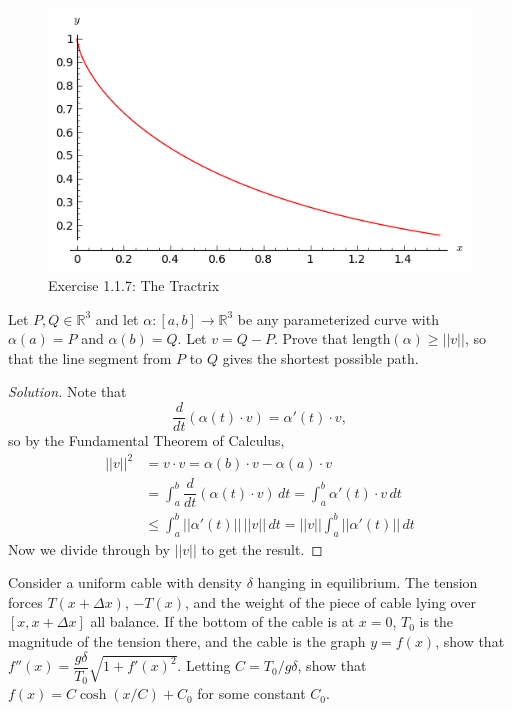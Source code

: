 \documentclass[Shifrin_Solutions_Spring_2018]{subfiles}
\begin{document}
\begin{figure}[h]
\centering
\includegraphics[width=.5\textwidth]{picturebook/ch1sec1/ex1-1-7}
\caption{Exercise 1.1.7: The Tractrix}
\end{figure}





\begin{exercise}
Let $P, Q \in \mathbb{R}^3$ and let $\alpha: [a,b] \rightarrow \mathbb{R}^3$ be any parameterized curve with $\alpha(a) = P$ and $\alpha(b) = Q$. Let $v= Q-P$. Prove that $\text{length}(\alpha) \geq ||v||$, so that the line segment from $P$ to $Q$ gives the shortest possible path.
\end{exercise}

\begin{proof}[Solution]
Note that
\[
\dfrac{d}{dt}\left( \alpha(t)\cdot v \right) = \alpha'(t)\cdot v ,
\]
so by the Fundamental Theorem of Calculus,
\[
\begin{split}
||v||^2 & = v \cdot v  =  \alpha(b)\cdot v - \alpha(a) \cdot v  \\
	& =  \int_a^b \dfrac{d}{dt}\left( \alpha(t)\cdot v \right) \, dt    = \int_a^b \alpha'(t)\cdot v \, dt \\
	& \leq \int_a^b ||\alpha'(t)|| \, ||v||\, dt = ||v|| \int_a^b ||\alpha'(t)||\, dt
\end{split}
\]
Now we divide through by $||v||$ to get the result.
\end{proof}

\vspace{.5cm}



\begin{exercise}
Consider a uniform cable with density $\delta$ hanging in equilibrium. The tension forces $T(x + \Delta x)$, $-T(x)$, and the weight of the piece of cable lying over $[x,x+\Delta x]$ all balance. If the bottom of the cable is at $x=0$, $T_0$ is the magnitude of the tension there, and the cable is the graph $y=f(x)$, show that $f''(x) = \dfrac{g\delta}{T_0}\sqrt{1 + f'(x)^2}$.  Letting $C = T_0/g\delta$, show that $f(x) = C\cosh(x/C) + C_0$ for some constant $C_0$.
\end{exercise}
\end{document}
